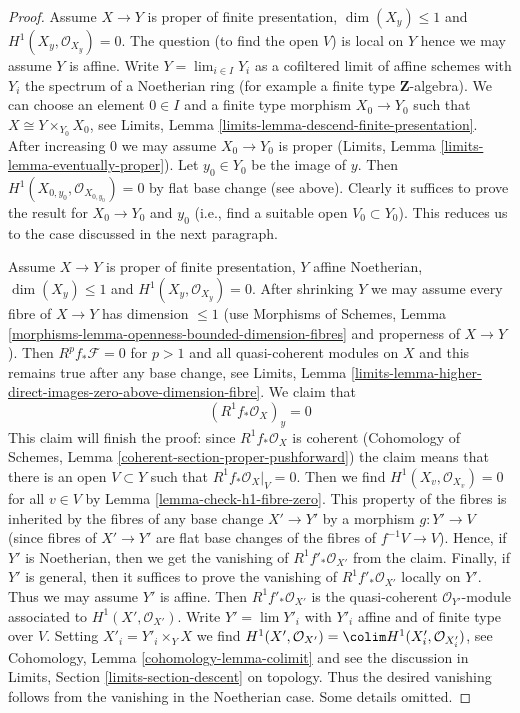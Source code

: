 \begin{proof}
\medskip\noindent
Assume $X \to Y$ is proper of finite presentation, $\dim(X_y) \leq 1$ and
$H^1(X_y, \mathcal{O}_{X_y}) = 0$. The question (to find the open $V$)
is local on $Y$ hence we may assume $Y$ is affine.
Write $Y = \lim_{i \in I} Y_i$ as a cofiltered limit of affine schemes
with $Y_i$ the spectrum of a Noetherian ring
(for example a finite type $\mathbf{Z}$-algebra).
We can choose an element $0 \in I$ and a finite type morphism
$X_0 \to Y_0$ such that $X \cong Y \times_{Y_0} X_0$, see
Limits, Lemma \ref{limits-lemma-descend-finite-presentation}.
After increasing $0$ we may assume $X_0 \to Y_0$ is proper
(Limits, Lemma \ref{limits-lemma-eventually-proper}).
Let $y_0 \in Y_0$ be the image of $y$.
Then $H^1(X_{0, y_0}, \mathcal{O}_{X_{0, y_0}}) = 0$
by flat base change (see above).
Clearly it suffices to prove the result for $X_0 \to Y_0$ and $y_0$
(i.e., find a suitable open $V_0 \subset Y_0$).
This reduces us to the case discussed in the next paragraph.

\medskip\noindent
Assume $X \to Y$ is proper of finite presentation, $Y$ affine Noetherian,
$\dim(X_y) \leq 1$ and $H^1(X_y, \mathcal{O}_{X_y}) = 0$.
After shrinking $Y$ we may assume every fibre of $X \to Y$
has dimension $\leq 1$ (use Morphisms of Schemes, Lemma
\ref{morphisms-lemma-openness-bounded-dimension-fibres}
and properness of $X \to Y$). Then $R^pf_*\mathcal{F} = 0$
for $p > 1$ and all quasi-coherent modules on $X$
and this remains true after any base change, see Limits, Lemma
\ref{limits-lemma-higher-direct-images-zero-above-dimension-fibre}.
We claim that
$$
(R^1f_*\mathcal{O}_X)_y = 0
$$
This claim will finish the proof: since $R^1f_*\mathcal{O}_X$ is
coherent (Cohomology of Schemes, Lemma
\ref{coherent-section-proper-pushforward})
the claim means that there is an open $V \subset Y$
such that $R^1f_*\mathcal{O}_X|_V = 0$. Then we find
$H^1(X_v, \mathcal{O}_{X_v}) = 0$ for all $v \in V$
by Lemma \ref{lemma-check-h1-fibre-zero}. This property of the fibres
is inherited by the fibres of any base change $X' \to Y'$
by a morphism $g : Y' \to V$ (since fibres of $X' \to Y'$
are flat base changes of the fibres of $f^{-1}V \to V$).
Hence, if $Y'$ is Noetherian, then we get the vanishing
of $R^1f'_*\mathcal{O}_{X'}$ from the claim. Finally, if
$Y'$ is general, then it suffices to prove the vanishing of
$R^1f'_*\mathcal{O}_{X'}$ locally on $Y'$. Thus we may
assume $Y'$ is affine. Then $R^1f'_*\mathcal{O}_{X'}$
is the quasi-coherent $\mathcal{O}_{Y'}$-module associated
to $H^1(X', \mathcal{O}_{X'})$. Write $Y' = \lim Y'_i$
with $Y'_i$ affine and of finite type over $V$.
Setting $X'_i = Y'_i \times_Y X$ we find
$H^1(X', \mathcal{O}_{X'}) = \colim H^1(X'_i, \mathcal{O}_{X'_i})$, see
Cohomology, Lemma \ref{cohomology-lemma-colimit} and see the discussion
in Limits, Section \ref{limits-section-descent} on topology.
Thus the desired vanishing follows from the vanishing in the Noetherian case.
Some details omitted.


\end{proof}
